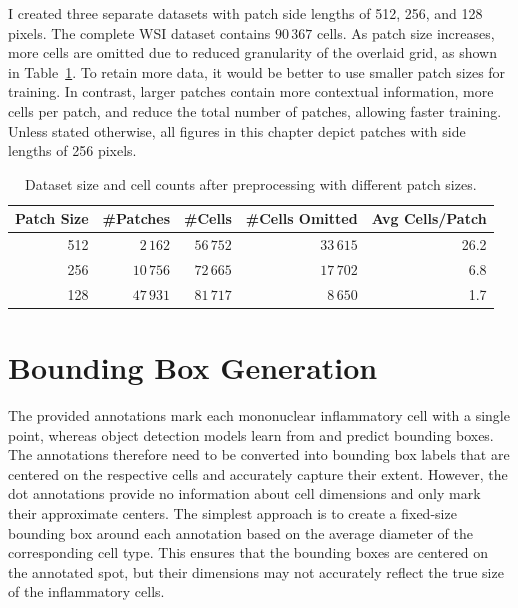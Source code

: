 I created three separate datasets with patch side lengths of 512, 256, and 128 pixels. The complete WSI dataset contains $90\,367$ cells. As patch size increases, more cells are omitted due to reduced granularity of the overlaid grid, as shown in Table~\ref{tab:patches}. To retain more data, it would be better to use smaller patch sizes for training. In contrast, larger patches contain more contextual information, more cells per patch, and reduce the total number of patches, allowing faster training. Unless stated otherwise, all figures in this chapter depict patches with side lengths of 256 pixels.

\begin{table}
    \centering
    \begin{tabular}{r|rrrr}
        \toprule
        Patch Size & \#Patches & \#Cells & \#Cells Omitted & Avg Cells/Patch \\
        \midrule
        512 & $2\,162$ & $56\,752$ & $33\,615$ & 26.2\\
        256 & $10\,756$ & $72\,665$ & $17\,702$ & 6.8\\
        128 & $47\,931$ & $81\,717$ & $8\,650$ & 1.7\\
        \bottomrule
    \end{tabular}
    \caption{Dataset size and cell counts after preprocessing with different patch sizes.}
    \label{tab:patches}
\end{table}


\section{Bounding Box Generation}
The provided annotations mark each mononuclear inflammatory cell with a single point, whereas object detection models learn from and predict bounding boxes. The annotations therefore need to be converted into bounding box labels that are centered on the respective cells and accurately capture their extent. However, the dot annotations provide no information about cell dimensions and only mark their approximate centers. The simplest approach is to create a fixed-size bounding box around each annotation based on the average diameter of the corresponding cell type. This ensures that the bounding boxes are centered on the annotated spot, but their dimensions may not accurately reflect the true size of the inflammatory cells.

